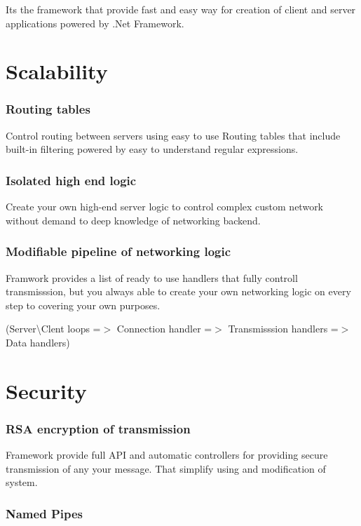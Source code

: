 It\textquotesingle{}s the framework that provide fast and easy way for creation of client and server applications powered by .Net Framework.

\section*{Scalability}

\subsubsection*{Routing tables}

Control routing between servers using easy to use {\ttfamily Routing tables} that include built-\/in filtering powered by easy to understand regular expressions.

\subsubsection*{Isolated high end logic}

Create your own high-\/end server logic to control complex custom network without demand to deep knowledge of networking backend.

\subsubsection*{Modifiable pipeline of networking logic}

Framwork provides a list of ready to use handlers that fully controll transmisssion, but you always able to create your own networking logic on every step to covering your own purposes.

{\ttfamily (Server\textbackslash{}Clent loops =$>$ Connection handler =$>$ Transmisssion handlers =$>$ Data handlers)}

\section*{Security}

\subsubsection*{R\+SA encryption of transmission}

Framework provide full A\+PI and automatic controllers for providing secure transmission of any your message. That simplify using and modification of system.

\subsubsection*{Named Pipes}

